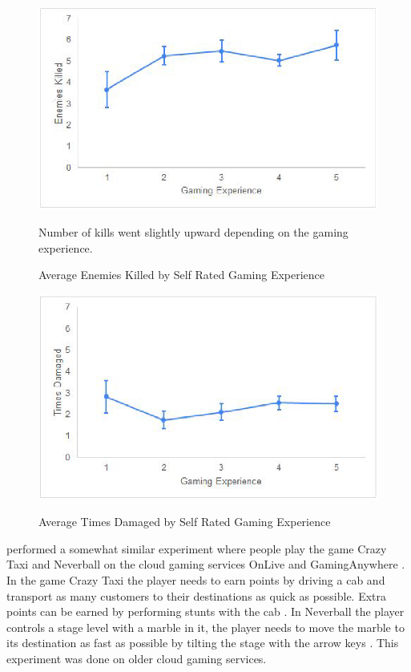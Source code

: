\begin{figure}[H]
	\centering
	\includegraphics[width=12cm]{../img/fig18.png}
	\caption{Average Enemies Killed by Self Rated Gaming Experience}
	Number of kills went slightly upward depending on the gaming experience.\\
	\parencite[Section 4.2.3, Page 41, Figure 18]{desveaux2020effects}
\end{figure}
\begin{figure}[H]
	\centering
	\includegraphics[width=12cm]{../img/fig19.png}
	\caption{Average Times Damaged by Self Rated Gaming Experience}
	\parencite[Section 4.2.3, Page 41, Figure 19]{desveaux2020effects}
\end{figure}
\newpage
\textcite{claypool2014effects} performed a somewhat similar experiment where people play the game Crazy Taxi and Neverball on the cloud gaming services OnLive and GamingAnywhere \parencite[Section 3]{claypool2014effects}. In the game Crazy Taxi the player needs to earn points by driving a cab and transport as many customers to their destinations as quick as possible. Extra points can be earned by performing stunts with the cab \parencite[Section 3.A]{claypool2014effects}. In Neverball the player controls a stage level with a marble in it, the player needs to move the marble to its destination as fast as possible by tilting the stage with the arrow keys \parencite[Section 3.A]{claypool2014effects}. This experiment was done on older cloud gaming services.
